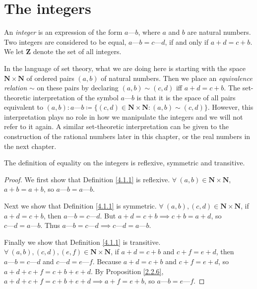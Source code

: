 \section{The integers}\label{sec 4.1}

\begin{definition}[Integers]\label{4.1.1}
    An \emph{integer} is an expression of the form \(a \text{---} b\), where \(a\) and \(b\) are natural numbers.
    Two integers are considered to be equal, \(a \text{---} b = c \text{---} d\), if and only if \(a + d = c + b\).
    We let \(\mathbf{Z}\) denote the set of all integers.
\end{definition}

\begin{note}
    In the language of set theory, what we are doing here is starting with the space \(\mathbf{N} \times \mathbf{N}\) of ordered pairs \((a, b)\) of natural numbers.
    Then we place an \emph{equivalence relation} \(\sim\) on these pairs by declaring \((a, b) \sim (c, d)\) iff \(a + d = c + b\).
    The set-theoretic interpretation of the symbol \(a \text{---} b\) is that it is the space of all pairs equivalent to \((a, b): a \text{---} b \coloneqq \{(c, d) \in \mathbf{N} \times \mathbf{N} : (a, b) \sim (c, d)\}\).
    However, this interpretation plays no role in how we manipulate the integers and we will not refer to it again.
    A similar set-theoretic interpretation can be given to the construction of the rational numbers later in this chapter, or the real numbers in the next chapter.
\end{note}

\begin{additional corollary}\label{ac 4.1.1}
The definition of equality on the integers is reflexive, symmetric and transitive.
\end{additional corollary}

\begin{proof}
    We first show that Definition \ref{4.1.1} is reflexive.
    \(\forall\ (a, b) \in \mathbf{N} \times \mathbf{N}\), \(a + b = a + b\), so \(a \text{---} b = a \text{---} b\).

    Next we show that Definition \ref{4.1.1} is symmetric.
    \(\forall\ (a, b), (c, d) \in \mathbf{N} \times \mathbf{N}\), if \(a + d = c + b\), then \(a \text{---} b = c \text{---} d\).
    But \(a + d = c + b \implies c + b = a + d\), so \(c \text{---} d = a \text{---} b\).
    Thus \(a \text{---} b = c \text{---} d \implies c \text{---} d = a \text{---} b\).

    Finally we show that Definition \ref{4.1.1} is transitive.
    \(\forall\ (a, b), (c, d), (e, f) \in \mathbf{N} \times \mathbf{N}\), if \(a + d = c + b\) and \(c + f = e + d\), then \(a \text{---} b = c \text{---} d\) and \(c \text{---} d = e \text{---} f\).
    Because \(a + d = c + b\) and \(c + f = e + d\), so \(a + d + c + f = c + b + e + d\).
    By Proposition \ref{2.2.6}, \(a + d + c + f = c + b + e + d \implies a + f = e + b\), so \(a \text{---} b = e \text{---} f\).
\end{proof}

